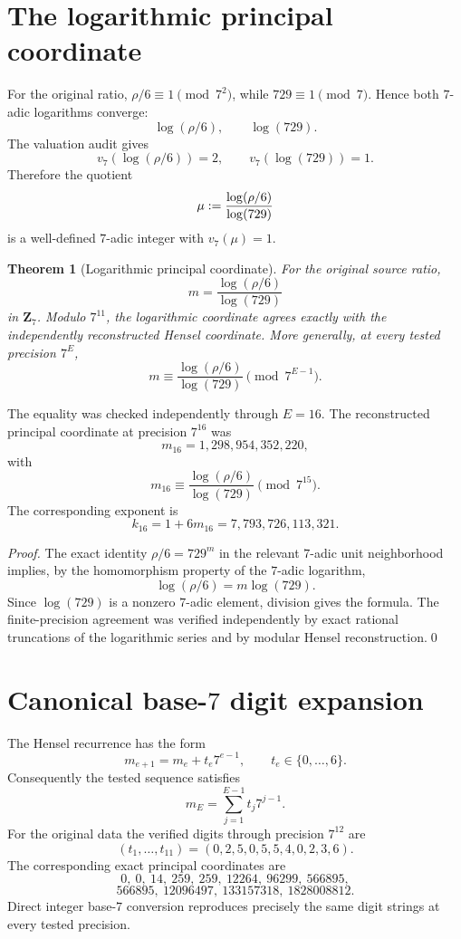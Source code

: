 \documentclass[11pt]{article}
\newtheorem{theorem}{Theorem}[section]
\theoremstyle{definition}
\theoremstyle{remark}
\begin{document}
\section{The logarithmic principal coordinate}
For the original ratio, $\rho/6\equiv1\pmod{7^2}$, while $729\equiv1\pmod7$. Hence both $7$-adic logarithms converge:
\[
\log(\rho/6),\qquad \log(729).
\]
The valuation audit gives
\[
v_7(\log(\rho/6))=2,
\qquad
v_7(\log(729))=1.
\]
Therefore the quotient
\[
\mu
:={\log(\rho/6)\over\log(729)}
\]
is a well-defined $7$-adic integer with $v_7(\mu)=1$.

\begin{theorem}[Logarithmic principal coordinate]
For the original source ratio,
\[
\boxed{
 m=\frac{\log(\rho/6)}{\log(729)}
}
\]
in $\mathbf Z_7$. Modulo $7^{11}$, the logarithmic coordinate agrees exactly with the independently reconstructed Hensel coordinate.
More generally, at every tested precision $7^E$,
\[
 m\equiv
 \frac{\log(\rho/6)}{\log(729)}
 \pmod{7^{E-1}}.
\]
\end{theorem}

The equality was checked independently through $E=16$. The reconstructed principal coordinate at precision $7^{16}$ was
\[
m_{16}=1{,}298{,}954{,}352{,}220,
\]
with
\[
 m_{16}
\equiv
\frac{\log(\rho/6)}{\log(729)}
\pmod{7^{15}}.
\]
The corresponding exponent is
\[
k_{16}=1+6m_{16}=7{,}793{,}726{,}113{,}321.
\]

\begin{proof}
The exact identity $\rho/6=729^m$ in the relevant $7$-adic unit neighborhood implies, by the homomorphism property of the $7$-adic logarithm,
\[
\log(\rho/6)=m\log(729).
\]
Since $\log(729)$ is a nonzero $7$-adic element, division gives the formula. The finite-precision agreement was verified independently by exact rational truncations of the logarithmic series and by modular Hensel reconstruction.\qed\end{proof}

\section{Canonical base-$7$ digit expansion}
The Hensel recurrence has the form
\[
m_{e+1}=m_e+t_e7^{e-1},
\qquad t_e\in\{0,\dots,6\}.
\]
Consequently the tested sequence satisfies
\[
m_E=\sum_{j=1}^{E-1}t_j7^{j-1}.
\]
For the original data the verified digits through precision $7^{12}$ are
\[
(t_1,\dots,t_{11})
=
(0,2,5,0,5,5,4,0,2,3,6).
\]
The corresponding exact principal coordinates are
\[
0,\ 0,\ 14,\ 259,\ 259,\ 12264,\ 96299,\ 566895,
\]
\[
566895,\ 12096497,\ 133157318,
\ 1828008812.
\]
Direct integer base-$7$ conversion reproduces precisely the same digit strings at every tested precision.
\end{document}
